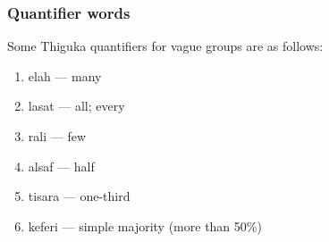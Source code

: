 \subsubsection*{Quantifier words}

Some Thiguka quantifiers for vague groups are as follows:
\begin{enumerate}
    \item elah --- many
    \item lasat --- all; every
    \item rali --- few
    \item alsaf --- half
    \item tisara --- one-third
    \item keferi --- simple majority (more than 50\%{})
          
\end{enumerate}

